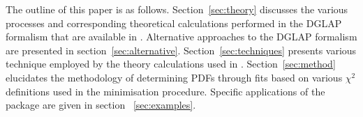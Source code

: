 The outline of this paper is as follows.
%
Section~\ref{sec:theory} discusses the various processes 
and corresponding theoretical calculations performed in the DGLAP~\cite{Gribov:1972ri,Gribov:1972rt,Lipatov:1974qm,
Dokshitzer:1977sg,Altarelli:1977zs} formalism that are available in \fitter.
Alternative approaches to the DGLAP formalism are presented in section~\ref{sec:alternative}.
%
Section~\ref{sec:techniques} presents various technique employed by the theory calculations used in \fitter.
Section~\ref{sec:method} elucidates the 
methodology of determining PDFs through fits based on various
 $\chi^2$ definitions used in the
minimisation procedure. 
%
Specific applications of the package are given in
section ~\ref{sec:examples}. 
%

